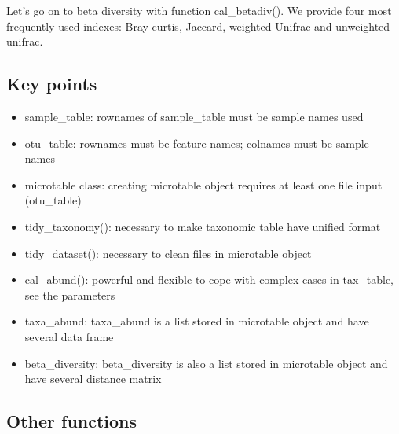 \documentclass[
]{book}
\newenvironment{Shaded}{\begin{snugshade}}{\end{snugshade}}
\newcommand{\AttributeTok}[1]{\textcolor[rgb]{0.77,0.63,0.00}{#1}}
\newcommand{\CommentTok}[1]{\textcolor[rgb]{0.56,0.35,0.01}{\textit{#1}}}
\newcommand{\ConstantTok}[1]{\textcolor[rgb]{0.00,0.00,0.00}{#1}}
\newcommand{\FunctionTok}[1]{\textcolor[rgb]{0.00,0.00,0.00}{#1}}
\newcommand{\NormalTok}[1]{#1}
\newcommand{\SpecialCharTok}[1]{\textcolor[rgb]{0.00,0.00,0.00}{#1}}
\newcommand{\StringTok}[1]{\textcolor[rgb]{0.31,0.60,0.02}{#1}}
\providecommand{\tightlist}{%
  \setlength{\itemsep}{0pt}\setlength{\parskip}{0pt}}
\begin{document}
Let's go on to beta diversity with function cal\_betadiv().
We provide four most frequently used indexes: Bray-curtis, Jaccard, weighted Unifrac and unweighted unifrac.

\begin{Shaded}
\end{Shaded}

\hypertarget{key-points}{%
\subsection{Key points}\label{key-points}}

\begin{itemize}
\tightlist
\item
  sample\_table: rownames of sample\_table must be sample names used
\item
  otu\_table: rownames must be feature names; colnames must be sample names
\item
  microtable class: creating microtable object requires at least one file input (otu\_table)
\item
  tidy\_taxonomy(): necessary to make taxonomic table have unified format
\item
  tidy\_dataset(): necessary to clean files in microtable object
\item
  cal\_abund(): powerful and flexible to cope with complex cases in tax\_table, see the parameters
\item
  taxa\_abund: taxa\_abund is a list stored in microtable object and have several data frame
\item
  beta\_diversity: beta\_diversity is also a list stored in microtable object and have several distance matrix
\end{itemize}

\hypertarget{other-functions}{%
\subsection{Other functions}\label{other-functions}}
\end{document}
